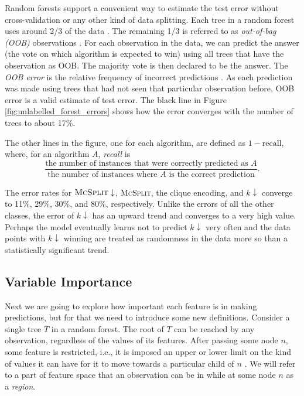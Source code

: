 \documentclass{l4proj}
\theoremstyle{definition}
\theoremstyle{remark}
\begin{document}
Random forests support a convenient way to estimate the test error without
cross-validation or any other kind of data splitting. Each tree in a random
forest uses around 2/3 of the data \cite{James:2014:ISL:2517747}. The remaining
1/3 is referred to as \emph{out-of-bag (OOB)} observations . For each
observation in the data, we can predict the answer (the vote on which algorithm
is expected to win) using all trees that have the observation as OOB. The
majority vote is then declared to be the answer. The \emph{OOB error} is
the relative frequency of incorrect predictions \cite{James:2014:ISL:2517747}.
As each prediction was made using trees that had not seen that particular
observation before, OOB error is a valid estimate of test error. The black line
in Figure \ref{fig:unlabelled_forest_errors} shows how the error converges with
the number of trees to about 17\%.

The other lines in the figure, one for each algorithm, are defined as $1 -
\text{recall}$, where, for an algorithm $A$, \emph{recall}
\cite{citeulike:12882259} is
\[ \frac{\text{the number of instances that were correctly predicted as
      $A$}}{\text{the number of instances where $A$ is the correct
      prediction}}. \]

The error rates for $\textsc{McSplit}\downarrow$, \textsc{McSplit}, the clique
encoding, and $k\downarrow$ converge to 11\%, 29\%, 30\%, and 80\%,
respectively. Unlike the errors of all the other classes, the error of
$k\downarrow$ has an upward trend and converges to a very high value. Perhaps
the model eventually learns not to predict $k\downarrow$ very often and the data
points with $k\downarrow$ winning are treated as randomness in the data more so
than a statistically significant trend.

\subsection{Variable Importance}

Next we are going to explore how important each feature is in making
predictions, but for that we need to introduce some new definitions. Consider a
single tree $T$ in a random forest. The root of $T$ can be reached by any
observation, regardless of the values of its features. After passing some node
$n$, some feature is restricted, i.e., it is imposed an upper or lower limit on
the kind of values it can have for it to move towards a particular child of $n$
\cite{James:2014:ISL:2517747}. We will refer to a part of feature space that an
observation can be in while at some node $n$ as a \emph{region}.
\end{document}
